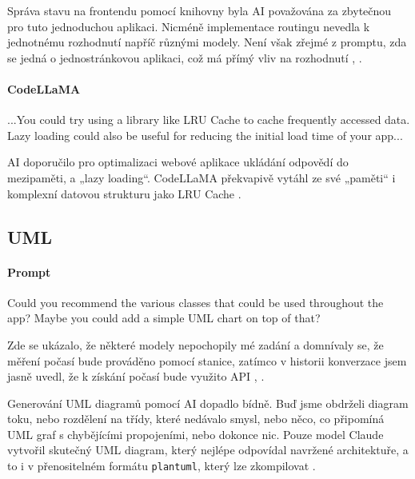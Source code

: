 \documentclass[FM,DP]{tulthesis}
\begin{document}
		Správa stavu na frontendu pomocí knihovny byla AI považována za zbytečnou pro tuto jednoduchou aplikaci. Nicméně implementace routingu nevedla k jednotnému rozhodnutí napříč různými modely. Není však zřejmé z promptu, zda se jedná o jednostránkovou aplikaci, což má přímý vliv na rozhodnutí \cite{claude_navrh}, \cite{chatgpt_navrh}.
		
		\vspace{0.6em}
		\begin{tcolorbox}[colback=white,colframe=black]
			\paragraph{CodeLLaMA}
			...You could try using a library like LRU Cache to cache frequently accessed data. Lazy loading could also be useful for reducing the initial load time of your app... \cite{codellama_navrh}
		\end{tcolorbox}
		\vspace{0.6em}
		
		AI doporučilo pro optimalizaci webové aplikace ukládání odpovědí do mezipaměti, a „lazy loading“. CodeLLaMA překvapivě vytáhl ze své „paměti“ i komplexní datovou strukturu jako LRU Cache \cite{gfg:LRU} \cite{codellama_navrh}.
		
		\subsection{UML}
		
		\vspace{0.6em}
		\begin{tcolorbox}[colback=white,colframe=black]
			\paragraph{Prompt}
			Could you recommend the various classes that could be used throughout the app? Maybe you could add a simple UML chart on top of that?
		\end{tcolorbox}
		\vspace{0.6em}
		
		Zde se ukázalo, že některé modely nepochopily mé zadání a domnívaly se, že měření počasí bude prováděno pomocí stanice, zatímco v historii konverzace jsem jasně uvedl, že k získání počasí bude využito API \cite{bard_navrh}, \cite{falcon_navrh}.
		
		Generování UML diagramů pomocí AI dopadlo bídně. Buď jsme obdrželi diagram toku, nebo rozdělení na třídy, které nedávalo smysl, nebo něco, co připomíná UML graf s chybějícími propojeními, nebo dokonce nic. Pouze model Claude vytvořil skutečný UML diagram, který nejlépe odpovídal navržené architektuře, a to i v přenositelném formátu \verb|plantuml|, který lze zkompilovat \cite{claude_navrh} \cite{codellama_navrh} \cite{wikipedia:uml}.
		
\end{document}
